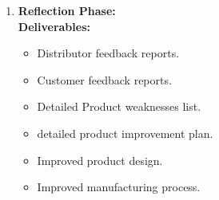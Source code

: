 \documentclass{article}
\begin{document}
\begin{enumerate}
\begin{itemize}
      \end{itemize}
    \item \textbf{Reflection Phase:} \\
      \textbf{Deliverables:}
      \begin{itemize}
        \item Distributor feedback reports. 
        \item Customer feedback reports. 
        \item Detailed Product weaknesses list. 
        \item detailed product improvement plan. 
        \item Improved product design. 
        \item Improved manufacturing process. 
      \end{itemize}
  \end{enumerate}
\end{document}
